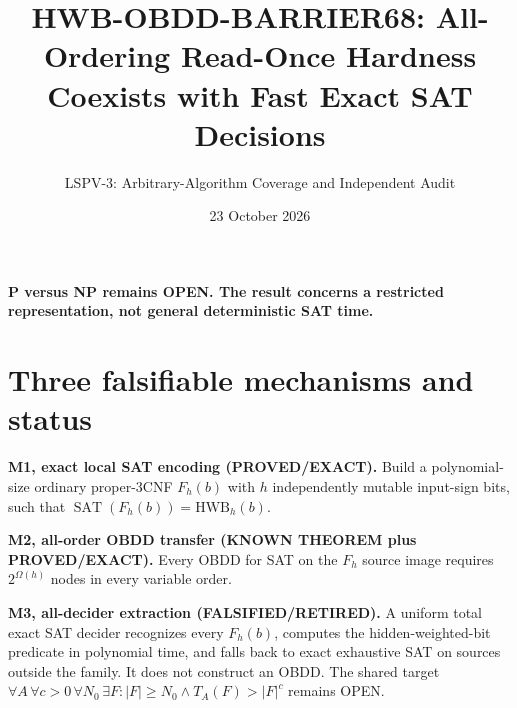 \documentclass[11pt]{article}
\title{HWB-OBDD-BARRIER68: All-Ordering Read-Once Hardness Coexists with Fast Exact SAT Decisions}
\author{LSPV-3: Arbitrary-Algorithm Coverage and Independent Audit}
\date{23 October 2026}
\begin{document}
\maketitle
\begin{center}\textbf{P versus NP remains OPEN. The result concerns a restricted representation, not general deterministic SAT time.}\end{center}

\section{Three falsifiable mechanisms and status}
\noindent\textbf{M1, exact local SAT encoding (PROVED/EXACT).}
Build a polynomial-size ordinary proper-3CNF $F_h(b)$ with $h$ independently mutable input-sign bits, such that $\operatorname{SAT}(F_h(b))=\mathrm{HWB}_h(b)$.
\par\noindent\textbf{M2, all-order OBDD transfer (KNOWN THEOREM plus PROVED/EXACT).}
Every OBDD for SAT on the $F_h$ source image requires $2^{\Omega(h)}$ nodes in every variable order.
\par\noindent\textbf{M3, all-decider extraction (FALSIFIED/RETIRED).}
A uniform total exact SAT decider recognizes every $F_h(b)$, computes the hidden-weighted-bit predicate in polynomial time, and falls back to exact exhaustive SAT on sources outside the family. It does not construct an OBDD.
The shared target $\forall A\,\forall c>0\,\forall N_0\,\exists F:|F|\ge N_0 \land T_A(F)>|F|^c$ remains OPEN.
\end{document}
